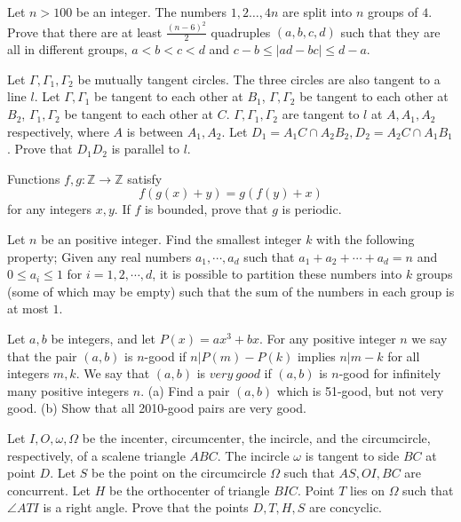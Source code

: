 \documentclass[11pt]{scrartcl}
\begin{document}
\begin{problem}[1082489055248212696]
Let $n>100$ be an integer. The numbers $1,2 \ldots, 4n$ are split into $n$ groups of $4$. Prove that there are at least $\frac{(n-6)^2}{2}$ quadruples $(a, b, c, d)$ such that they are all in different groups, $a<b<c<d$ and $c-b \leq |ad-bc|\leq d-a$.
\end{problem}
\begin{problem}[1121095467606378762]
	Let $\Gamma, \Gamma_1, \Gamma_2$ be mutually tangent circles. The three circles are also tangent to a line $l$. Let $\Gamma, \Gamma_1$ be tangent to each other at $B_1$, $\Gamma, \Gamma_2$ be tangent to each other at $B_2$, $\Gamma_1, \Gamma_2$ be tangent to each other at $C$. $\Gamma, \Gamma_1, \Gamma_2$ are tangent to $l$ at $A, A_1, A_2$ respectively, where $A$ is between $A_1,A_2$. Let $D_1 = A_1C \cap A_2B_2, D_2 = A_2C \cap A_1B_1$. Prove that $D_1D_2$ is parallel to $l$.
\end{problem}
\begin{problem}[1146649639092133254]
Functions $f,g:\mathbb{Z}\to\mathbb{Z}$ satisfy$$f(g(x)+y)=g(f(y)+x)$$for any integers $x,y$. If $f$ is bounded, prove that $g$ is periodic.
\end{problem}
\begin{problem}[1154252954200953594]
Let $n$ be an positive integer. Find the smallest integer $k$ with the following property; Given any real numbers $a_1 , \cdots , a_d $ such that $a_1 + a_2 + \cdots + a_d = n$ and $0 \le a_i \le 1$ for $i=1,2,\cdots ,d$, it is possible to partition these numbers into $k$ groups (some of which may be empty) such that the sum of the numbers in each group is at most $1$.
\end{problem}
\begin{problem}[1159469125385582912]
	Let $a, b$ be integers, and let $P(x) = ax^3+bx.$ For any positive integer $n$ we say that the pair $(a,b)$ is $n$-good if $n | P(m)-P(k)$ implies $n | m - k$ for all integers $m, k.$ We say that $(a,b)$ is $very \ good$ if $(a,b)$ is $n$-good for infinitely many positive integers $n.$
(a) Find a pair $(a,b)$ which is 51-good, but not very good.
(b) Show that all 2010-good pairs are very good.
\end{problem}
\begin{problem}[1168447466971762345]
	Let $I, O, \omega, \Omega$ be the incenter, circumcenter, the incircle, and the circumcircle, respectively, of a scalene triangle $ABC$. The incircle $\omega$ is tangent to side $BC$ at point $D$. Let $S$ be the point on the circumcircle $\Omega$ such that $AS, OI, BC$ are concurrent. Let $H$ be the orthocenter of triangle $BIC$. Point $T$ lies on $\Omega$ such that $\angle ATI$ is a right angle. Prove that the points $D, T, H, S$ are concyclic.
\end{problem}
\end{document}

